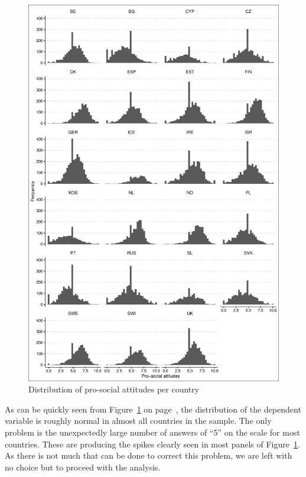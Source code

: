 \documentclass[12pt,english]{article}\usepackage[]{graphicx}\usepackage[usenames, dvipsnames]{xcolor}
\begin{document}
\begin{figure}[ht]
 \centering
 \includegraphics[scale=0.75]{../../05-graphs/Supplem-03.pdf}
 \caption{\label{fig:fig-01} Distribution of pro-social attitudes per country}
\end{figure}

As can be quickly seen from Figure~\ref{fig:fig-01} on page~\pageref{fig:fig-01}, the distribution of the dependent variable is roughly normal in almost all countries in the sample. The only problem is the unexpectedly large number of answers of ``5'' on the scale for most countries. These are producing the spikes clearly seen in most panels of Figure~\ref{fig:fig-01}. As there is not much that can be done to correct this problem, we are left with no choice but to proceed with the analysis.
\end{document}
